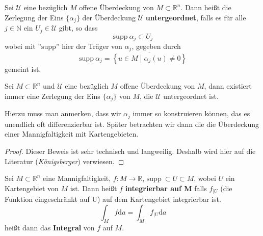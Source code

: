 \begin{definition}[Unterordnung]
	Sei $\mathcal{U}$ eine bezüglich $M$ offene Überdeckung von 
	$M\subset\mathbb{R}^n$. Dann heißt die Zerlegung der Eins $\{\alpha_j\}$ 
	der Überdeckung $\mathcal{U}$ \textbf{untergeordnet}, falls es 
	für alle $j\in\mathbb{N}$ ein $U_j\in\mathcal{U}$ gibt, so dass
	\begin{equation*}
		\mathrm{supp\ }\alpha_j\subset U_j
	\end{equation*} 
	wobei mit ''$\mathrm{supp}$'' hier der Träger von $\alpha_j$, 
	gegeben durch 
	\begin{equation*}
		\mathrm{supp\ }\alpha_j=\overline{\left\{u\in M \middle| \alpha_j(u)\neq 0 \right\} }
	\end{equation*}
	gemeint ist.
\end{definition}

\begin{satz}
	Sei $M\subset\mathbb{R}^n$ und $\mathcal{U}$ eine bezüglich $M$ 
	offene Überdeckung von $M$, dann existiert immer eine Zerlegung 
	der Eins $\{\alpha_j\}$ von $M$, die $\mathcal{U}$ untergeordnet 
	ist.
\end{satz}

Hierzu muss man anmerken, dass wir $\alpha_j$ immer so konstruieren 
können, das es unendlich oft differenzierbar ist. Später betrachten 
wir dann die die Überdeckung einer Mannigfaltigkeit mit Kartengebieten. 

\begin{proof}
	Dieser Beweis ist sehr technisch und langweilig. Deshalb wird hier 
	auf die Literatur (\emph{Königsberger}) verwiesen.
\end{proof}

\begin{definition}
	Sei $M\subset\mathbb{R}^n$ eine Mannigfaltigkeit, $f:M\rightarrow\mathbb{R}$, 
	$\mathrm{supp\ }\subset U \subset M$, wobei $U$ ein Kartengebiet 
	von $M$ ist. Dann heißt $f$ \textbf{integrierbar auf M} falls 
	$f_{|U}$ (die Funktion eingeschränkt auf U) auf dem Kartengebiet 
	integrierbar ist.
	\begin{equation}
		\int_Mf\mathrm{d}a=\int_Mf_{|U}\mathrm{d}a
	\end{equation}
	heißt dann das \textbf{Integral} von $f$ auf $M$.
\end{definition}
\newpage

